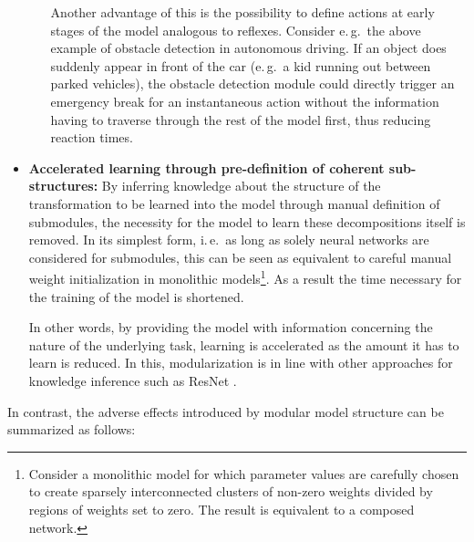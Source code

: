 \begin{itemize}
\begin{itemize}
            Another advantage of this is the possibility to define actions at early stages of the model analogous to reflexes. Consider e.\,g.\ the above example of obstacle detection in autonomous driving. If an object does suddenly appear in front of the car (e.\,g.\ a kid running out between parked vehicles), the obstacle detection module could directly trigger an emergency break for an instantaneous action without the information having to traverse through the rest of the model first, thus reducing reaction times.
        \end{itemize}
    \item \textbf{Accelerated learning through pre-definition of coherent sub-structures:} By inferring knowledge about the structure of the transformation to be learned into the model through manual definition of submodules, the necessity for the model to learn these decompositions itself is removed. In its simplest form, i.\,e.\ as long as solely neural networks are considered for submodules, this can be seen as equivalent to careful manual weight initialization in monolithic models\footnote{Consider a monolithic model for which parameter values are carefully chosen to create sparsely interconnected clusters of non-zero weights divided by regions of weights set to zero. The result is equivalent to a composed network.}. As a result the time necessary for the training of the model is shortened.
    
    In other words, by providing the model with information concerning the nature of the underlying task, learning is accelerated as the amount it has to learn is reduced. In this, modularization is in line with other approaches for knowledge inference such as ResNet \cite{He2015-cq}.
\end{itemize}

In contrast, the adverse effects introduced by modular model structure can be summarized as follows:

